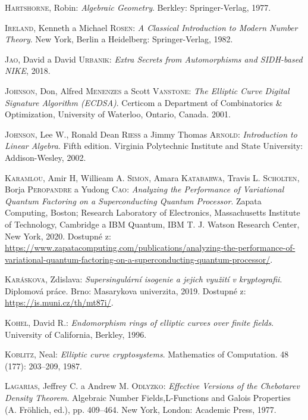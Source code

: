 \documentclass[12pt]{report}
\begin{document}
\begin{thebibliography}{97}
\textsc{Hartshorne}, Robin: \textit{Algebraic  Geometry}. Berkley: Springer-Verlag, 1977.

\textsc{Ireland}, Kenneth a Michael \textsc{Rosen}: \textit{A Classical Introduction to Modern Number Theory}. New York, Berlin a Heidelberg: Springer-Verlag, 1982.

\textsc{Jao}, David a David \textsc{Urbanik}: \textit{Extra Secrets from Automorphisms and SIDH-based NIKE}, 2018.

\textsc{Johnson}, Don, Alfred \textsc{Menenzes} a Scott \textsc{Vanstone}: \textit{The Elliptic Curve Digital Signature Algorithm (ECDSA)}. Certicom a Department of Combinatorics \& Optimization, University of Waterloo,  Ontario, Canada. 2001.

\textsc{Johnson}, Lee W., Ronald Dean \textsc{Riess} a Jimmy Thomas \textsc{Arnold}: \textit{Introduction to Linear Algebra}. Fifth edition. Virginia Polytechnic Institute and State University: Addison-Wesley, 2002.

\textsc{Karamlou}, Amir H, Willieam A. \textsc{Simon}, Amara \textsc{Katabarwa}, Travis L. \textsc{Scholten}, Borja \textsc{Peropandre} a Yudong \textsc{Cao}: \textit{Analyzing the Performance of Variational Quantum Factoring on a Superconducting Quantum Processor}. Zapata Computing, Boston; Research Laboratory of Electronics, Massachusetts Institute of Technology, Cambridge a IBM Quantum, IBM T. J. Watson Research Center, New York, 2020. Dostupné z: \url{https://www.zapatacomputing.com/publications/analyzing-the-performance-of-variational-quantum-factoring-on-a-superconducting-quantum-processor/}.

\textsc{Karáskova}, Zdislava: \textit{Supersingulární isogenie a jejich využití v kryptografii}. Diplomová práce. Brno: Masarykova univerzita, 2019. Dostupné z: \url{https://is.muni.cz/th/mt87i/}.

\textsc{Kohel}, David R.: \textit{Endomorphism rings of elliptic curves over finite fields}. University of California, Berkley, 1996.

\textsc{Koblitz}, Neal: \textit{Elliptic curve cryptosystems}. Mathematics of Computation. 48 (177): 203–209, 1987.

\textsc{Lagarias}, Jeffrey C. a Andrew M. \textsc{Odlyzko}: \textit{Effective Versions of the Chebotarev Density Theorem}. Algebraic Number Fields,L-Functions and Galois Properties (A. Fröhlich, ed.), pp. 409–464. New York, London: Academic Press, 1977.


\end{thebibliography}
\end{document}
